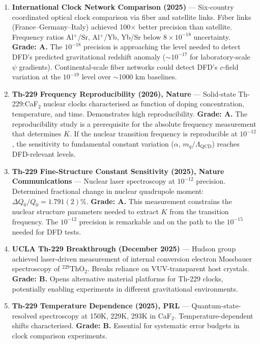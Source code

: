 \documentclass[11pt,a4paper]{article}
\begin{document}
\begin{enumerate}

\item \textbf{International Clock Network Comparison (2025)} --- Six-country coordinated optical clock comparison via fiber and satellite links. Fiber links (France--Germany--Italy) achieved 100$\times$ better precision than satellite. Frequency ratios Al$^+$/Sr, Al$^+$/Yb, Yb/Sr below $8 \times 10^{-18}$ uncertainty. \textbf{Grade: A.} The $10^{-18}$ precision is approaching the level needed to detect DFD's predicted gravitational redshift anomaly ($\sim 10^{-17}$ for laboratory-scale $\psi$ gradients). Continental-scale fiber networks could detect DFD's $c$-field variation at the $10^{-19}$ level over $\sim$1000 km baselines.

\item \textbf{Th-229 Frequency Reproducibility (2026), Nature} --- Solid-state Th-229:CaF$_2$ nuclear clocks characterised as function of doping concentration, temperature, and time. Demonstrates high reproducibility. \textbf{Grade: A.} The reproducibility study is a prerequisite for the absolute frequency measurement that determines $K$. If the nuclear transition frequency is reproducible at $10^{-12}$, the sensitivity to fundamental constant variation ($\alpha$, $m_q/\Lambda_\mathrm{QCD}$) reaches DFD-relevant levels.

\item \textbf{Th-229 Fine-Structure Constant Sensitivity (2025), Nature Communications} --- Nuclear laser spectroscopy at $10^{-12}$ precision. Determined fractional change in nuclear quadrupole moment: $\Delta Q_0/Q_0 = 1.791(2)\%$. \textbf{Grade: A.} This measurement constrains the nuclear structure parameters needed to extract $K$ from the transition frequency. The $10^{-12}$ precision is remarkable and on the path to the $10^{-15}$ needed for DFD tests.

\item \textbf{UCLA Th-229 Breakthrough (December 2025)} --- Hudson group achieved laser-driven measurement of internal conversion electron Mossbauer spectroscopy of $^{229}$ThO$_2$. Breaks reliance on VUV-transparent host crystals. \textbf{Grade: B.} Opens alternative material platforms for Th-229 clocks, potentially enabling experiments in different gravitational environments.

\item \textbf{Th-229 Temperature Dependence (2025), PRL} --- Quantum-state-resolved spectroscopy at 150K, 229K, 293K in CaF$_2$. Temperature-dependent shifts characterised. \textbf{Grade: B.} Essential for systematic error budgets in clock comparison experiments.

\end{enumerate}
\end{document}
